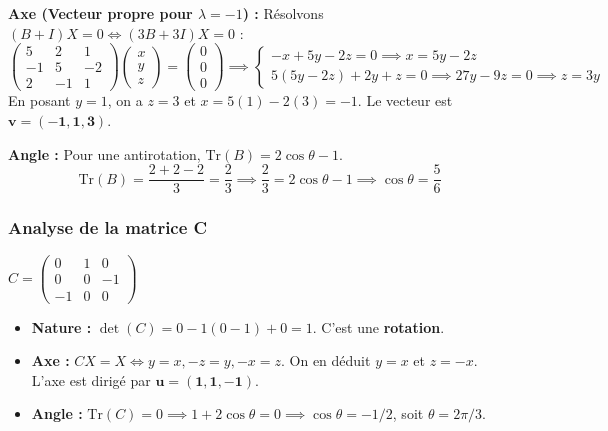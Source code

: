 \documentclass[french]{yLectureNote}
\begin{document}
     \textbf{Axe (Vecteur propre pour $\lambda = -1$) :} Résolvons $(B+I)X = 0 \iff (3B+3I)X = 0$ :
    \[ \begin{pmatrix} 5 & 2 & 1 \\ -1 & 5 & -2 \\ 2 & -1 & 1 \end{pmatrix} \begin{pmatrix} x \\ y \\ z \end{pmatrix} = \begin{pmatrix} 0 \\ 0 \\ 0 \end{pmatrix} \implies
    \begin{cases} -x + 5y - 2z = 0 \implies x = 5y - 2z \\ 5(5y-2z) + 2y + z = 0 \implies 27y - 9z = 0 \implies z = 3y \end{cases} \]
    En posant $y=1$, on a $z=3$ et $x=5(1)-2(3)=-1$. Le vecteur est $\mathbf{v = (-1, 1, 3)}$.
    
     \textbf{Angle :} Pour une antirotation, $\text{Tr}(B) = 2\cos\theta - 1$.
    \[ \text{Tr}(B) = \frac{2+2-2}{3} = \frac{2}{3} \implies \frac{2}{3} = 2\cos\theta - 1 \implies \cos\theta = \frac{5}{6} \]



\subsubsection{Analyse de la matrice C}
$C = \begin{pmatrix} 0 & 1 & 0 \\ 0 & 0 & -1 \\ -1 & 0 & 0 \end{pmatrix}$


\begin{itemize}
    \item \textbf{Nature :} $\det(C) = 0 - 1(0-1) + 0 = 1$. C'est une \textbf{rotation}.
    \item \textbf{Axe :} $CX=X \iff y=x, -z=y, -x=z$. On en déduit $y=x$ et $z=-x$. 
    L'axe est dirigé par $\mathbf{u = (1, 1, -1)}$.
    \item \textbf{Angle :} $\text{Tr}(C) = 0 \implies 1 + 2\cos\theta = 0 \implies \cos\theta = -1/2$, soit $\theta = 2\pi/3$.
\end{itemize}
\end{document}
